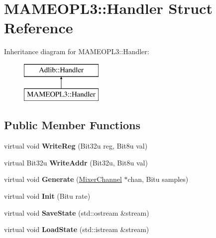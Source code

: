 \hypertarget{structMAMEOPL3_1_1Handler}{\section{M\-A\-M\-E\-O\-P\-L3\-:\-:Handler Struct Reference}
\label{structMAMEOPL3_1_1Handler}
}
Inheritance diagram for M\-A\-M\-E\-O\-P\-L3\-:\-:Handler\-:\begin{figure}[H]
\begin{center}
\leavevmode
\includegraphics[height=2.000000cm]{structMAMEOPL3_1_1Handler}
\end{center}
\end{figure}
\subsection*{Public Member Functions}
\begin{DoxyCompactItemize}
\item 
\hypertarget{structMAMEOPL3_1_1Handler_a903af88fdc2e8d43f6ac1f6da3645641}{virtual void {\bfseries Write\-Reg} (Bit32u reg, Bit8u val)}\label{structMAMEOPL3_1_1Handler_a903af88fdc2e8d43f6ac1f6da3645641}

\item 
\hypertarget{structMAMEOPL3_1_1Handler_a86658776086c980510f7d684ac71fc1d}{virtual Bit32u {\bfseries Write\-Addr} (Bit32u, Bit8u val)}\label{structMAMEOPL3_1_1Handler_a86658776086c980510f7d684ac71fc1d}

\item 
\hypertarget{structMAMEOPL3_1_1Handler_a6cee2abd16dd077eceb58117fad9bcd7}{virtual void {\bfseries Generate} (\hyperlink{classMixerChannel}{Mixer\-Channel} $\ast$chan, Bitu samples)}\label{structMAMEOPL3_1_1Handler_a6cee2abd16dd077eceb58117fad9bcd7}

\item 
\hypertarget{structMAMEOPL3_1_1Handler_a89c2dcd0b41d1da12ef7a98dc51d2f9f}{virtual void {\bfseries Init} (Bitu rate)}\label{structMAMEOPL3_1_1Handler_a89c2dcd0b41d1da12ef7a98dc51d2f9f}

\item 
\hypertarget{structMAMEOPL3_1_1Handler_a5e88a89eb36236f0f0463f3e8052dce1}{virtual void {\bfseries Save\-State} (std\-::ostream \&stream)}\label{structMAMEOPL3_1_1Handler_a5e88a89eb36236f0f0463f3e8052dce1}

\item 
\hypertarget{structMAMEOPL3_1_1Handler_a34e4e0d2632d27727589c94fca4eb60c}{virtual void {\bfseries Load\-State} (std\-::istream \&stream)}\label{structMAMEOPL3_1_1Handler_a34e4e0d2632d27727589c94fca4eb60c}

\end{DoxyCompactItemize}
